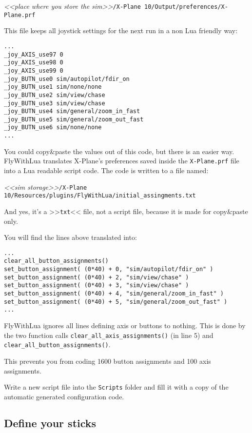 \documentclass[11pt,parskip=half,a4paper]{scrartcl}
\begin{document}
\emph{<<place where you store the sim>>}\verb|/X-Plane 10/Output/preferences/X-Plane.prf|

This file keeps all joystick settings for the next run in a non Lua friendly way:

\begin{lstlisting}[firstnumber=1680]
...
_joy_AXIS_use97 0
_joy_AXIS_use98 0
_joy_AXIS_use99 0
_joy_BUTN_use0 sim/autopilot/fdir_on
_joy_BUTN_use1 sim/none/none
_joy_BUTN_use2 sim/view/chase
_joy_BUTN_use3 sim/view/chase
_joy_BUTN_use4 sim/general/zoom_in_fast
_joy_BUTN_use5 sim/general/zoom_out_fast
_joy_BUTN_use6 sim/none/none
...
\end{lstlisting}


You could copy\&paste the values out of this code, but there is an easier way. FlyWithLua translates X-Plane's preferences saved inside the \verb|X-Plane.prf| file into a Lua readable script code. The code is written to a file named:

\emph{<<sim storage>>}\verb|/X-Plane 10/Resources/plugins/FlyWithLua/initial_assingments.txt|

And yes, it's a >>\verb|txt|<< file, not a script file, because it is made for copy\&paste only.

You will find the lines above translated into:

\begin{lstlisting}[firstnumber=12]
...
clear_all_button_assignments()
set_button_assignment( (0*40) + 0, "sim/autopilot/fdir_on" )
set_button_assignment( (0*40) + 2, "sim/view/chase" )
set_button_assignment( (0*40) + 3, "sim/view/chase" )
set_button_assignment( (0*40) + 4, "sim/general/zoom_in_fast" )
set_button_assignment( (0*40) + 5, "sim/general/zoom_out_fast" )
...
\end{lstlisting}

FlyWithLua ignores all lines defining axis or buttons to nothing. This is done by the two function calls \verb|clear_all_axis_assignments()| (in line 5) and \verb|clear_all_button_assignments()|.

This prevents you from coding 1600 button assignments and 100 axis assignments.

Write a new script file into the \verb|Scripts| folder and fill it with a copy of the automatic generated configuration code.

\subsection{Define your sticks}
\end{document}
